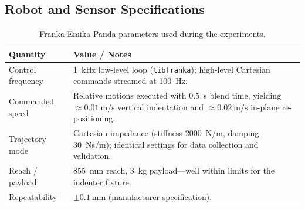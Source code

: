 \documentclass[11pt,a4paper]{article}
\begin{document}
\subsection{Robot and Sensor Specifications}
\begin{table}[H]
    \centering
    \renewcommand{\arraystretch}{1.2}
    \caption{Franka Emika Panda parameters used during the experiments.}
    \begin{tabular}{@{}p{4.8cm}p{9.2cm}@{}}
        \toprule
        Quantity & Value / Notes \\
        \midrule
        Control frequency & \SI{1}{\kilo\hertz} low-level loop (\texttt{libfranka}); high-level Cartesian commands streamed at \SI{100}{\hertz}. \\[0.4em]
        Commanded speed & Relative motions executed with \SI{0.5}{\second} blend time, yielding \(\approx \SI{0.01}{\metre\per\second}\) vertical indentation and \(\approx \SI{0.02}{\metre\per\second}\) in-plane re-positioning. \\[0.4em]
        Trajectory mode & Cartesian impedance (stiffness 2000~N/m, damping 30~Ns/m); identical settings for data collection and validation. \\[0.4em]
        Reach / payload & \SI{855}{\milli\metre} reach, \SI{3}{\kilo\gram} payload---well within limits for the indenter fixture. \\[0.4em]
        Repeatability & \(\pm \SI{0.1}{\milli\metre}\) (manufacturer specification). \\
        \bottomrule
    \end{tabular}
    \label{tab:robot-specs}
\end{table}
\end{document}
